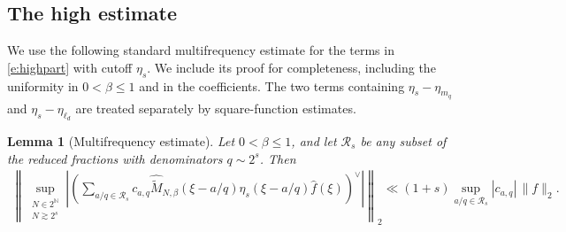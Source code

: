 \documentclass[12pt,reqno]{amsart}
\numberwithin{equation}{section}
\newtheorem{lemma}[equation]{Lemma}
\theoremstyle{definition}
\theoremstyle{remark}
\begin{document}
\subsection{The high estimate}



We use the following standard multifrequency estimate for the terms in
\eqref{e:highpart} with cutoff $\eta_s$.  We include its proof for
completeness, including the uniformity in $0<\beta\leq1$ and in the
coefficients.  The two terms containing
\(\eta_s-\eta_{m_q}\) and \(\eta_s-\eta_{\ell_d}\) are treated
separately by square-function estimates.

\begin{lemma}[Multifrequency estimate]\label{l:notBourgain}
Let \(0<\beta\leq1\), and let \(\mathcal R_s\) be any subset of the
reduced fractions with denominators \(q\sim2^s\).  Then
\begin{align}\label{e:notBourgain}
\left\|
 \sup_{\substack{N\in2^{\mathbb N}\\N\gtrsim2^s}}
 \left|
 \left(
 \sum_{a/q\in\mathcal R_s}
 c_{a,q}\widehat{\widetilde M}_{N,\beta}(\xi-a/q)
 \eta_s(\xi-a/q)\widehat f(\xi)
 \right)^\vee
 \right|
 \right\|_2
 \ll
 (1+s)\sup_{a/q\in\mathcal R_s}|c_{a,q}|\,\|f\|_2.
\end{align}
\end{lemma}
\end{document}
